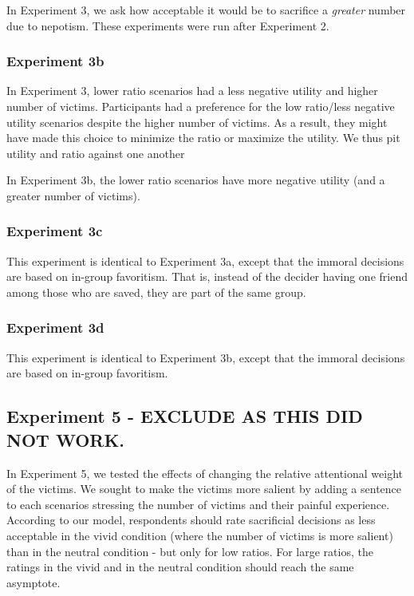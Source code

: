 \documentclass[
]{article}
\begin{document}
In Experiment 3, we ask how acceptable it would be to sacrifice a \emph{greater} number due to nepotism. These experiments were run after Experiment 2.

\subsubsection{Experiment 3b}\label{experiment-3b}

In Experiment 3, lower ratio scenarios had a less negative utility and higher number of victims. Participants had a preference for the low ratio/less negative utility scenarios despite the higher number of victims. As a result, they might have made this choice to minimize the ratio or maximize the utility. We thus pit utility and ratio against one another

In Experiment 3b, the lower ratio scenarios have more negative utility (and a greater number of victims).

\subsubsection{Experiment 3c}\label{experiment-3c}

This experiment is identical to Experiment 3a, except that the immoral decisions are based on in-group favoritism. That is, instead of the decider having one friend among those who are saved, they are part of the same group.

\subsubsection{Experiment 3d}\label{experiment-3d}

This experiment is identical to Experiment 3b, except that the immoral decisions are based on in-group favoritism.

\subsection{Experiment 5 - EXCLUDE AS THIS DID NOT WORK.}\label{experiment-5---exclude-as-this-did-not-work.}

In Experiment 5, we tested the effects of changing the relative attentional weight of the victims. We sought to make the victims more salient by adding a sentence to each scenarios stressing the number of victims and their painful experience. According to our model, respondents should rate sacrificial decisions as less acceptable in the vivid condition (where the number of victims is more salient) than in the neutral condition - but only for low ratios. For large ratios, the ratings in the vivid and in the neutral condition should reach the same asymptote.
\end{document}

